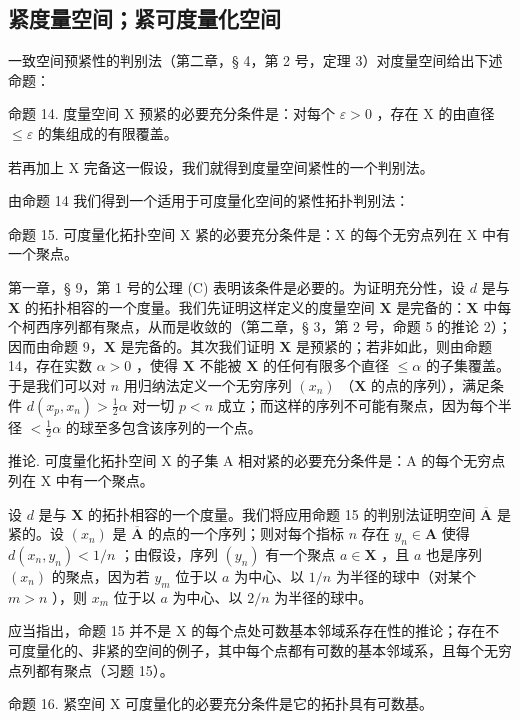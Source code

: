 \subsection{紧度量空间；紧可度量化空间}

一致空间预紧性的判别法（第二章，§ 4，第 2 号，定理 3）对度量空间给出下述命题：

命题 14. 度量空间 X 预紧的必要充分条件是：对每个 \(\varepsilon > 0\) ，存在 X 的由直径 \(\leqslant \varepsilon\) 的集组成的有限覆盖。

若再加上 X 完备这一假设，我们就得到度量空间紧性的一个判别法。

由命题 14 我们得到一个适用于可度量化空间的紧性拓扑判别法：

命题 15. 可度量化拓扑空间 X 紧的必要充分条件是：X 的每个无穷点列在 X 中有一个聚点。

第一章，§ 9，第 1 号的公理 (C) 表明该条件是必要的。为证明充分性，设 \(d\) 是与 \(\mathbf{X}\) 的拓扑相容的一个度量。我们先证明这样定义的度量空间 \(\mathbf{X}\) 是完备的：\(\mathbf{X}\) 中每个柯西序列都有聚点，从而是收敛的（第二章，§ 3，第 2 号，命题 5 的推论 2）；因而由命题 9，\(\mathbf{X}\) 是完备的。其次我们证明 \(\mathbf{X}\) 是预紧的；若非如此，则由命题 14，存在实数 \(\alpha > 0\) ，使得 \(\mathbf{X}\) 不能被 \(\mathbf{X}\) 的任何有限多个直径 \(\leqslant \alpha\) 的子集覆盖。于是我们可以对 \(n\) 用归纳法定义一个无穷序列 \((x_n)\) （\(\mathbf{X}\) 的点的序列），满足条件 \(d(x_p, x_n) > \frac{1}{2} \alpha\) 对一切 \(p < n\) 成立；而这样的序列不可能有聚点，因为每个半径 \(< \frac{1}{2} \alpha\) 的球至多包含该序列的一个点。

推论. 可度量化拓扑空间 X 的子集 A 相对紧的必要充分条件是：A 的每个无穷点列在 X 中有一个聚点。

设 \(d\) 是与 \(\mathbf{X}\) 的拓扑相容的一个度量。我们将应用命题 15 的判别法证明空间 \(\overline{\mathbf{A}}\) 是紧的。设 \((x_{n})\) 是 \(\overline{\mathbf{A}}\) 的点的一个序列；则对每个指标 \(n\) 存在 \(y_{n} \in \mathbf{A}\) 使得 \(d(x_{n}, y_{n}) < 1/n\) ；由假设，序列 \((y_{n})\) 有一个聚点 \(a \in \mathbf{X}\) ，且 \(a\) 也是序列 \((x_{n})\) 的聚点，因为若 \(y_{m}\) 位于以 \(a\) 为中心、以 \(1/n\) 为半径的球中（对某个 \(m > n\) ），则 \(x_{m}\) 位于以 \(a\) 为中心、以 \(2/n\) 为半径的球中。

应当指出，命题 15 并不是 X 的每个点处可数基本邻域系存在性的推论；存在不可度量化的、非紧的空间的例子，其中每个点都有可数的基本邻域系，且每个无穷点列都有聚点（习题 15）。

命题 16. 紧空间 X 可度量化的必要充分条件是它的拓扑具有可数基。

